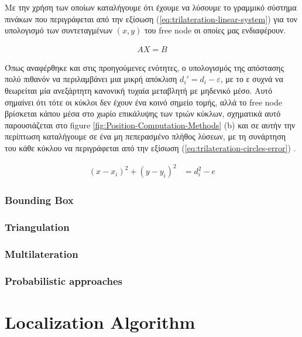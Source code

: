 Με την χρήση των οποίων καταλήγουμε ότι έχουμε να λύσουμε το γραμμικό σύστημα πινάκων που περιγράφεται από την εξίσωση (\ref{eq:trilateration-linear-system}) για τον
υπολογισμό των συντεταγμένων $(x,y)$ του free node οι οποίες μας ενδιαφέρουν.

\begin{align}
	AX = B \label{eq:trilateration-linear-system}
\end{align}

Όπως αναφέρθηκε και στις προηγούμενες ενότητες, ο υπολογισμός της απόστασης πολύ πιθανόν να περιλαμβάνει μια μικρή απόκλιση $d_i' = d_i - ε$, 
με το ε συχνά να θεωρείται μία ανεξάρτητη κανονική τυχαία μεταβλητή με μηδενικό μέσο. Αυτό σημαίνει ότι
τότε οι κύκλοι δεν έχουν ένα κοινό σημείο τομής, αλλά το free node βρίσκεται κάπου μέσα στο χωρίο επικάλυψης
των τριών κύκλων, σχηματικά αυτό παρουσιάζεται στο figure \ref{fig:Position-Computation-Methods} (b) και σε αυτήν την περίπτωση καταλήγουμε σε ένα
μη πεπερασμένο πλήθος λύσεων, με τη συνάρτηση του κάθε κύκλου να περιγράφεται από την εξίσωση
(\ref{eq:trilateration-circles-error}) \cite{wsn-Localization-systems}.

\begin{align}
	(x-x_i)^2 + (y-y_i)^2 &= d_i^2-e \label{eq:trilateration-circles-error}
\end{align}

\subsubsection{Bounding Box}

\subsubsection{Triangulation}

\subsubsection{Multilateration}

\subsubsection{Probabilistic approaches}


\section{Localization Algorithm} \label{sec:Chapter2-3} 

